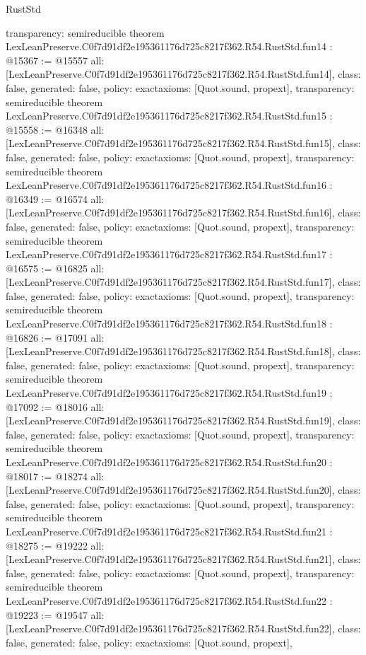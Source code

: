 \begin{lexlean}{RustStd}
\begin{coremodule}
{  transparency: semireducible
}
theorem LexLeanPreserve.C0f7d91df2e195361176d725c8217f362.R54.RustStd.fun14 : @15367 := @15557 {
  all: [LexLeanPreserve.C0f7d91df2e195361176d725c8217f362.R54.RustStd.fun14],
  class: false,
  generated: false,
  policy: exact{axioms: [Quot.sound, propext]},
  transparency: semireducible
}
theorem LexLeanPreserve.C0f7d91df2e195361176d725c8217f362.R54.RustStd.fun15 : @15558 := @16348 {
  all: [LexLeanPreserve.C0f7d91df2e195361176d725c8217f362.R54.RustStd.fun15],
  class: false,
  generated: false,
  policy: exact{axioms: [Quot.sound, propext]},
  transparency: semireducible
}
theorem LexLeanPreserve.C0f7d91df2e195361176d725c8217f362.R54.RustStd.fun16 : @16349 := @16574 {
  all: [LexLeanPreserve.C0f7d91df2e195361176d725c8217f362.R54.RustStd.fun16],
  class: false,
  generated: false,
  policy: exact{axioms: [Quot.sound, propext]},
  transparency: semireducible
}
theorem LexLeanPreserve.C0f7d91df2e195361176d725c8217f362.R54.RustStd.fun17 : @16575 := @16825 {
  all: [LexLeanPreserve.C0f7d91df2e195361176d725c8217f362.R54.RustStd.fun17],
  class: false,
  generated: false,
  policy: exact{axioms: [Quot.sound, propext]},
  transparency: semireducible
}
theorem LexLeanPreserve.C0f7d91df2e195361176d725c8217f362.R54.RustStd.fun18 : @16826 := @17091 {
  all: [LexLeanPreserve.C0f7d91df2e195361176d725c8217f362.R54.RustStd.fun18],
  class: false,
  generated: false,
  policy: exact{axioms: [Quot.sound, propext]},
  transparency: semireducible
}
theorem LexLeanPreserve.C0f7d91df2e195361176d725c8217f362.R54.RustStd.fun19 : @17092 := @18016 {
  all: [LexLeanPreserve.C0f7d91df2e195361176d725c8217f362.R54.RustStd.fun19],
  class: false,
  generated: false,
  policy: exact{axioms: [Quot.sound, propext]},
  transparency: semireducible
}
theorem LexLeanPreserve.C0f7d91df2e195361176d725c8217f362.R54.RustStd.fun20 : @18017 := @18274 {
  all: [LexLeanPreserve.C0f7d91df2e195361176d725c8217f362.R54.RustStd.fun20],
  class: false,
  generated: false,
  policy: exact{axioms: [Quot.sound, propext]},
  transparency: semireducible
}
theorem LexLeanPreserve.C0f7d91df2e195361176d725c8217f362.R54.RustStd.fun21 : @18275 := @19222 {
  all: [LexLeanPreserve.C0f7d91df2e195361176d725c8217f362.R54.RustStd.fun21],
  class: false,
  generated: false,
  policy: exact{axioms: [Quot.sound, propext]},
  transparency: semireducible
}
theorem LexLeanPreserve.C0f7d91df2e195361176d725c8217f362.R54.RustStd.fun22 : @19223 := @19547 {
  all: [LexLeanPreserve.C0f7d91df2e195361176d725c8217f362.R54.RustStd.fun22],
  class: false,
  generated: false,
  policy: exact{axioms: [Quot.sound, propext]},
}
\end{coremodule}
\end{lexlean}
